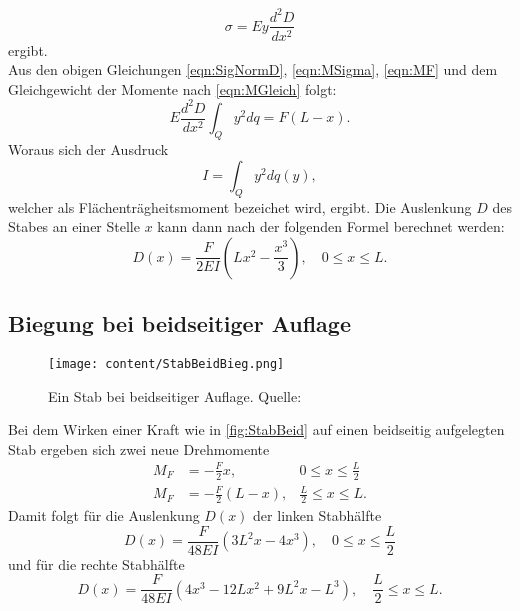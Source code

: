 \begin{equation}
    \label{eqn:SigNormD}
    \sigma = Ey\frac{d^2D}{dx^2}
\end{equation}
ergibt. \\
Aus den obigen Gleichungen \eqref{eqn:SigNormD}, \eqref{eqn:MSigma}, \eqref{eqn:MF} und dem Gleichgewicht der Momente nach \eqref{eqn:MGleich} folgt:
\begin{equation}
    E\frac{d^2D}{dx^2} \int_Q y^2dq = F(L-x).
\end{equation}
Woraus sich der Ausdruck
\begin{equation}
    I = \int_Q y^2dq(y),
\end{equation}
welcher als Flächenträgheitsmoment bezeichet wird, ergibt.
Die Auslenkung $D$ des Stabes an einer Stelle $x$ kann dann nach der folgenden Formel berechnet werden:
\begin{equation}
    \label{eqn:DvonX}
    D\left(x\right) = \frac{F}{2EI}\left(Lx^2-\frac{x^3}{3}\right),\quad 0\leq x \leq L.
\end{equation}
\subsection{Biegung bei beidseitiger Auflage}
\label{subsec:BeidseitigeAuflage}
\begin{figure}[H]
    \centering
    \texttt{[image: content/StabBeidBieg.png]}
    \caption{Ein Stab bei beidseitiger Auflage. Quelle: \cite{sample}}  %
    \label{fig:StabBeid}
\end{figure}
Bei dem Wirken einer Kraft wie in \autoref{fig:StabBeid} auf einen beidseitig aufgelegten Stab ergeben sich zwei neue Drehmomente
\begin{align}
    M_F &= -\frac{F}{2}x, &0 \leq x \leq \frac{L}{2}\\
    M_F &= -\frac{F}{2}(L-x), &\frac{L}{2} \leq x \leq L.
\end{align}
Damit folgt für die Auslenkung $D(x)$ der linken Stabhälfte
\begin{equation}
    D(x) = \frac{F}{48EI}\left(3L^2x-4x^3\right), \quad 0 \leq x \leq \frac{L}{2}
\end{equation}
und für die rechte Stabhälfte
\begin{equation}
    D(x) = \frac{F}{48EI}\left(4x^3 - 12Lx^2 + 9L^2x - L^3\right), \quad \frac{L}{2} \leq x \leq L.
\end{equation}

